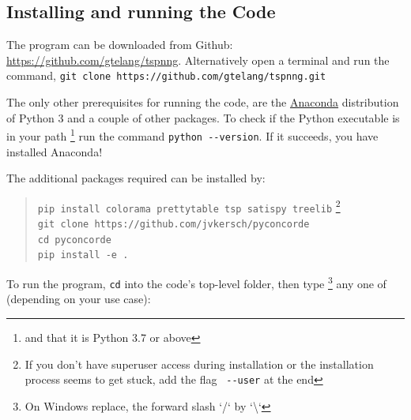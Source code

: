 \newpage%

\begin{appendices}
\renewcommand{\thesection}{\Alph{section}}

\section{Installing and running the Code}
\label{sec:install}

The program can be downloaded from Github: \url{https://github.com/gtelang/tspnng}. Alternatively
open a terminal and run the command, \texttt{git clone https://github.com/gtelang/tspnng.git}

The only other prerequisites for running the code, are the 
\href{https://www.anaconda.com/products/individual}{Anaconda} distribution of Python 3 
and a couple of other packages.  To check if the Python executable is in your path \footnote{and that it is Python 3.7 or above}
run the command \verb|python --version|. If it succeeds, you have installed Anaconda! 

The additional packages required can be installed by: 

\begin{quote}
\color{blue}
\texttt{pip install colorama prettytable tsp satispy treelib} \footnote{If you don't have superuser access during installation or the installation process seems to get stuck, add the flag \texttt{\color{red} \texttt{-{}-}user} at the end}   \\
\texttt{git clone https://github.com/jvkersch/pyconcorde} \\
\texttt{cd pyconcorde}\\
\texttt{pip install -e .}
\end{quote}


To run the program, \texttt{cd} into the code's top-level folder, then type \footnote{On Windows replace, the forward slash `/` by `\textbackslash`}
any one of (depending on your use case): 



\end{appendices}
